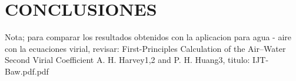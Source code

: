 \chapter{CONCLUSIONES}
Nota; para comparar los resultados obtenidos con la aplicacion para agua - aire
con la ecuaciones virial, revisar: First-Principles Calculation of the Air–Water Second
Virial Coefficient  A. H. Harvey1,2 and P. H. Huang3, titulo: IJT-Baw.pdf.pdf